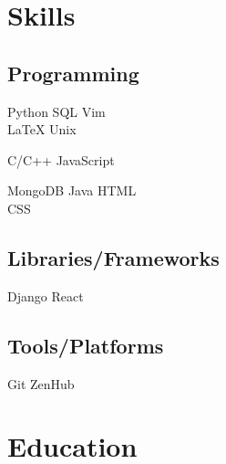 \documentclass[]{latex/resume}
\begin{document}
\begin{minipage}[t]{0.25\textwidth} 


\section{Skills}
    \subsection{Programming}
        \sectionsep
            Python \textbullet{} SQL \textbullet{} Vim \\ \LaTeX \textbullet{} Unix \\

        \sectionsep
        
            C/C++ \textbullet{} JavaScript \\
        
        \sectionsep
        
            MongoDB \textbullet{} Java \textbullet{} HTML \textbullet{} \\ CSS \\
    
    \sectionsep
    \sectionsep
    
    \subsection{Libraries/Frameworks}
        \sectionsep
        Django \textbullet{} React\\
    
    \sectionsep
    \sectionsep
    
    \subsection{Tools/Platforms}
        \sectionsep
        Git \textbullet{} ZenHub \\

\sectionsep


\section{Education} 

\end{minipage}
\end{document}
